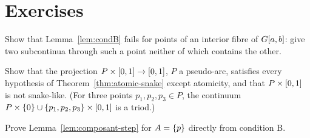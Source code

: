 \section*{Exercises}

\begin{exercise}
Show that Lemma~\ref{lem:condB} fails for points of an interior fibre of $G[a,b]$: give two subcontinua through such a point neither of which contains the
other.
\end{exercise}

\begin{exercise}
Show that the projection $P\times[0,1]\to[0,1]$, $P$ a pseudo-arc, satisfies every hypothesis of Theorem~\ref{thm:atomic-snake} except atomicity, and that
$P\times[0,1]$ is not snake-like. (For three points $p_1,p_2,p_3\in P$, the continuum $P\times\left\{ 0 \right\}\cup\left\{ p_1,p_2,p_3 \right\}\times[0,1]$ is a
triod.)
\end{exercise}

\begin{exercise}
Prove Lemma~\ref{lem:composant-step} for $A=\left\{ p \right\}$ directly from condition B.
\end{exercise}
